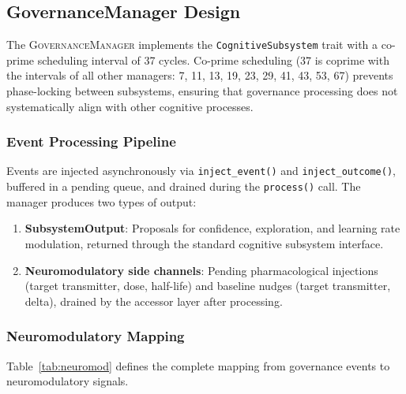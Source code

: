 \documentclass[11pt,a4paper]{article}
\begin{document}
\subsection{GovernanceManager Design}

The \textsc{GovernanceManager} implements the \texttt{CognitiveSubsystem} trait with a co-prime scheduling interval of 37 cycles.
Co-prime scheduling (37 is coprime with the intervals of all other managers: 7, 11, 13, 19, 23, 29, 41, 43, 53, 67) prevents phase-locking between subsystems, ensuring that governance processing does not systematically align with other cognitive processes.

\subsubsection{Event Processing Pipeline}

Events are injected asynchronously via \texttt{inject\_event()} and \texttt{inject\_outcome()}, buffered in a pending queue, and drained during the \texttt{process()} call.
The manager produces two types of output:

\begin{enumerate}
  \item \textbf{SubsystemOutput}: Proposals for confidence, exploration, and learning rate modulation, returned through the standard cognitive subsystem interface.
  \item \textbf{Neuromodulatory side channels}: Pending pharmacological injections (target transmitter, dose, half-life) and baseline nudges (target transmitter, delta), drained by the accessor layer after processing.
\end{enumerate}

\subsubsection{Neuromodulatory Mapping}

Table~\ref{tab:neuromod} defines the complete mapping from governance events to neuromodulatory signals.
\end{document}
